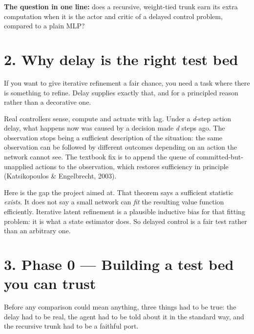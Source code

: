 \documentclass[11pt]{article}
\begin{document}
\textbf{The question in one line:} does a recursive, weight-tied trunk earn its extra computation when it is the actor and critic of a delayed control problem, compared to a plain MLP?



\section*{2. Why delay is the right test bed}



If you want to give iterative refinement a fair chance, you need a task where there is something to refine. Delay supplies exactly that, and for a principled reason rather than a decorative one.



Real controllers sense, compute and actuate with lag. Under a \emph{d}-step action delay, what happens now was caused by a decision made \emph{d} steps ago. The observation stops being a sufficient description of the situation: the same observation can be followed by different outcomes depending on an action the network cannot see. The textbook fix is to append the queue of committed-but-unapplied actions to the observation, which restores sufficiency in principle (Katsikopoulos \& Engelbrecht, 2003).



Here is the gap the project aimed at. That theorem says a sufficient statistic \emph{exists}. It does not say a small network can \emph{fit} the resulting value function efficiently. Iterative latent refinement is a plausible inductive bias for that fitting problem: it is what a state estimator does. So delayed control is a fair test rather than an arbitrary one.



\section*{3. Phase 0 --- Building a test bed you can trust}



Before any comparison could mean anything, three things had to be true: the delay had to be real, the agent had to be told about it in the standard way, and the recursive trunk had to be a faithful port.
\end{document}
